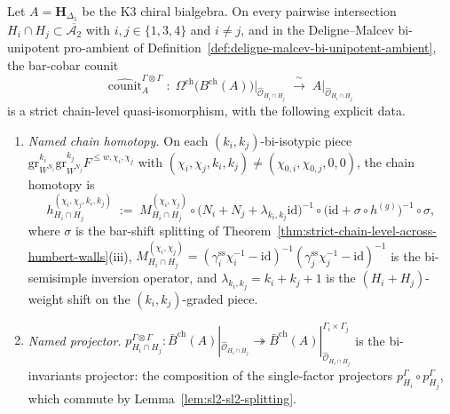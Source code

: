 \begin{theorem}
\label{thm:mc5-wall-of-walls-strict-chain-level}
\ClaimStatusConditional
{}%
%
%
Let $A = \mathbf{H}_{\Delta_5}$ be the K3 chiral bialgebra. On every
pairwise intersection $H_i\cap H_j\subset\overline{\mathcal{A}_2}$
with $i,j\in\{1,3,4\}$ and $i\neq j$, and in the Deligne--Malcev
bi-unipotent pro-ambient of
Definition~\textup{\ref{def:deligne-malcev-bi-unipotent-ambient}}, the
bar-cobar counit
\[
\widehat{\mathrm{counit}}^{\Gamma\otimes\Gamma}_A
\;\colon\;
\Omega^{\mathrm{ch}}\bigl(B^{\mathrm{ch}}(A)\bigr)
\big|_{\widehat{\mathcal{O}}_{H_i\cap H_j}}
\;\xrightarrow{\;\sim\;}\;
A\big|_{\widehat{\mathcal{O}}_{H_i\cap H_j}}
\]
is a strict chain-level quasi-isomorphism, with the following explicit
data.
\begin{enumerate}[label=\textup{(\alph*)}]
\item \emph{Named chain homotopy.} On each
$(k_i,k_j)$-bi-isotypic piece
$\mathrm{gr}^{k_i}_{W^{N_i}}\mathrm{gr}^{k_j}_{W^{N_j}}
F^{\leq w,\chi_i,\chi_j}$ with
$(\chi_i,\chi_j,k_i,k_j)\neq(\chi_{0,i},\chi_{0,j},0,0)$, the chain
homotopy is
\begin{equation}
\label{eq:wall-of-walls-chain-homotopy}
h^{(\chi_i,\chi_j,k_i,k_j)}_{H_i\cap H_j}
\;:=\;
M^{(\chi_i,\chi_j)}_{H_i\cap H_j}
\circ
\bigl(N_i+N_j+\lambda_{k_i,k_j}\mathrm{id}\bigr)^{-1}
\circ
\bigl(\mathrm{id}+\sigma\circ h^{(g)}\bigr)^{-1}
\circ
\sigma,
\end{equation}
where $\sigma$ is the bar-shift splitting of
Theorem~\textup{\ref{thm:strict-chain-level-across-humbert-walls}}(iii),
$M^{(\chi_i,\chi_j)}_{H_i\cap H_j}
= (\gamma_i^{\mathrm{ss}}\chi_i^{-1} - \mathrm{id})^{-1}
 (\gamma_j^{\mathrm{ss}}\chi_j^{-1} - \mathrm{id})^{-1}$
is the bi-semisimple inversion operator, and
$\lambda_{k_i,k_j}=k_i+k_j+1$ is the $(H_i+H_j)$-weight shift on the
$(k_i,k_j)$-graded piece.
\item \emph{Named projector.}
$p^{\Gamma\otimes\Gamma}_{H_i\cap H_j}
\colon \bar B^{\mathrm{ch}}(A)|_{\widehat{\mathcal{O}}_{H_i\cap H_j}}
\twoheadrightarrow
\bar B^{\mathrm{ch}}(A)|_{\widehat{\mathcal{O}}_{H_i\cap H_j}}^{\Gamma_i\times\Gamma_j}$
is the bi-invariants projector: the composition of the single-factor
projectors $p^{\Gamma}_{H_i}\circ p^{\Gamma}_{H_j}$, which commute by
Lemma~\textup{\ref{lem:sl2-sl2-splitting}}.

\end{enumerate}
\end{theorem}
